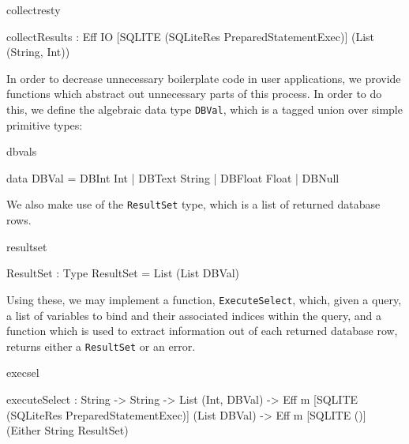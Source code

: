 \begin{SaveVerbatim}{collectresty}

collectResults : Eff IO 
            [SQLITE (SQLiteRes PreparedStatementExec)] 
            (List (String, Int))
\end{SaveVerbatim}


\noindent
{}

\noindent
{}

In order to decrease unnecessary boilerplate code in user applications, we
provide functions which abstract out unnecessary parts of this process. In
order to do this, we define the algebraic data type \texttt{DBVal}, which is a
tagged union over simple primitive types:

\begin{SaveVerbatim}{dbvals}

data DBVal = DBInt Int     | DBText String
           | DBFloat Float | DBNull

\end{SaveVerbatim}

\noindent
We also make use of the \texttt{ResultSet} type, which is a list of returned
database rows.

\begin{SaveVerbatim}{resultset}

ResultSet : Type
ResultSet = List (List DBVal)

\end{SaveVerbatim}

\noindent
Using these, we may implement a function, \texttt{ExecuteSelect}, which, given
a query, a list of variables to bind and their associated indices within the
query, and a function which is used to extract information out of each returned
database row, returns either a \texttt{ResultSet} or an error.

\begin{SaveVerbatim}{execsel}

executeSelect : 
  String -> String -> List (Int, DBVal) -> 
  Eff m [SQLITE (SQLiteRes PreparedStatementExec)] 
                 (List DBVal) -> 
  Eff m [SQLITE ()] (Either String ResultSet)
  
\end{SaveVerbatim}


